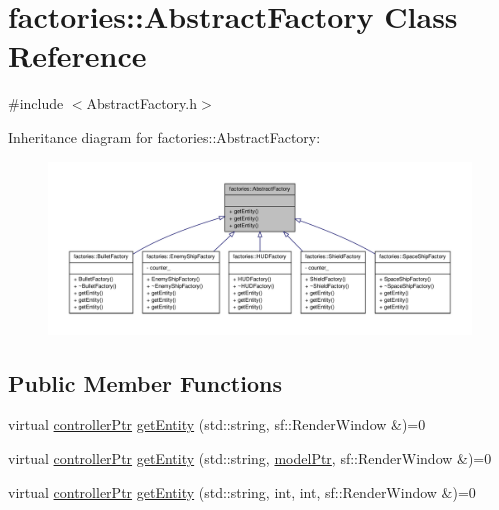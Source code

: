 \hypertarget{classfactories_1_1AbstractFactory}{\section{factories\-:\-:\-Abstract\-Factory \-Class \-Reference}
\label{d4/d92/classfactories_1_1AbstractFactory}
}


{\ttfamily \#include $<$\-Abstract\-Factory.\-h$>$}



\-Inheritance diagram for factories\-:\-:\-Abstract\-Factory\-:
\nopagebreak
\begin{figure}[H]
\begin{center}
\leavevmode
\includegraphics[width=350pt]{da/db6/classfactories_1_1AbstractFactory__inherit__graph}
\end{center}
\end{figure}
\subsection*{\-Public \-Member \-Functions}
\begin{DoxyCompactItemize}
\item 
virtual \hyperlink{Game_8h_a21b04f6cf2d5990b82725fac5ea2ce9a}{controller\-Ptr} \hyperlink{classfactories_1_1AbstractFactory_a18220cbcb9acb58ee704142f33975abe}{get\-Entity} (std\-::string, sf\-::\-Render\-Window \&)=0
\item 
virtual \hyperlink{Game_8h_a21b04f6cf2d5990b82725fac5ea2ce9a}{controller\-Ptr} \hyperlink{classfactories_1_1AbstractFactory_a916e94392336a3e6a28a090faeb62b8b}{get\-Entity} (std\-::string, \hyperlink{ModelView_8h_a78966ddb517fca8d2b29a2bc5c31e74e}{model\-Ptr}, sf\-::\-Render\-Window \&)=0
\item 
virtual \hyperlink{Game_8h_a21b04f6cf2d5990b82725fac5ea2ce9a}{controller\-Ptr} \hyperlink{classfactories_1_1AbstractFactory_a5f440d7b3410e85f7079dac8326ae06c}{get\-Entity} (std\-::string, int, int, sf\-::\-Render\-Window \&)=0
\end{DoxyCompactItemize}



